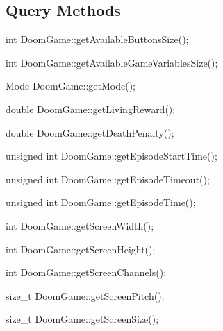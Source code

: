 \subsection{Query Methods}


\begin{clinee}
int DoomGame::getAvailableButtonsSize();
\end{clinee}

\begin{clinee}
int DoomGame::getAvailableGameVariablesSize();
\end{clinee}

\begin{clinee}
Mode DoomGame::getMode();
\end{clinee}

\begin{clinee}
double DoomGame::getLivingReward();
\end{clinee}

\begin{clinee}
double DoomGame::getDeathPenalty();
\end{clinee}

\begin{clinee}
unsigned int DoomGame::getEpisodeStartTime();
\end{clinee}

\begin{clinee}
unsigned int DoomGame::getEpisodeTimeout();
\end{clinee}

\begin{clinee}
unsigned int DoomGame::getEpisodeTime();
\end{clinee}

\begin{clinee}
int DoomGame::getScreenWidth();
\end{clinee}

\begin{clinee}
int DoomGame::getScreenHeight();
\end{clinee}

\begin{clinee}
int DoomGame::getScreenChannels();
\end{clinee}

\begin{clinee}
size_t DoomGame::getScreenPitch();
\end{clinee}

\begin{clinee}
size_t DoomGame::getScreenSize();
\end{clinee}

